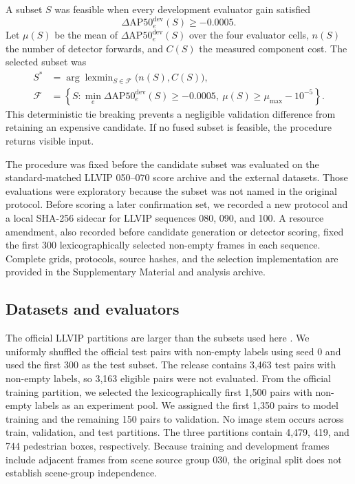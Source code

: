 \documentclass[preprint,11pt]{elsarticle}
\begin{document}
A subset \(S\) was feasible when every development evaluator gain satisfied
\begin{equation}
\Delta \mathrm{AP50}^{\mathrm{dev}}_e(S) \ge -0.0005.
\end{equation}
Let \(\mu(S)\) be the mean of
\(\Delta \mathrm{AP50}^{\mathrm{dev}}_e(S)\) over the four evaluator cells,
\(n(S)\) the number of detector forwards, and \(C(S)\) the measured component
cost. The selected subset was
\begin{equation}
\begin{aligned}
S^\ast&=\arg\operatorname{lexmin}_{S\in\mathcal{F}}
\bigl(n(S),C(S)\bigr),\\
\mathcal{F}&=\left\{S:
\min_e\Delta \mathrm{AP50}^{\mathrm{dev}}_e(S)\ge-0.0005,
\ \mu(S)\ge\mu_{\max}-10^{-5}
\right\}.
\end{aligned}
\end{equation}
This deterministic tie breaking prevents a negligible validation difference
from retaining an expensive candidate. If no fused subset is feasible, the
procedure returns visible input.

The procedure was fixed before the candidate subset was evaluated on the
standard-matched LLVIP 050--070 score archive and the external datasets. Those
evaluations were exploratory because the subset was not named in the original
protocol. Before scoring a later confirmation set, we recorded a new protocol
and a local SHA-256 sidecar for LLVIP sequences 080, 090, and 100. A resource
amendment, also recorded before candidate generation or detector scoring,
fixed the first 300 lexicographically selected non-empty frames in each
sequence. Complete grids, protocols, source hashes, and the selection
implementation are provided in the Supplementary Material and analysis
archive.

\subsection{Datasets and evaluators}

The official LLVIP partitions are larger than the subsets used here
\cite{jia2021}. We uniformly shuffled the official test pairs with non-empty
labels using seed 0 and used the first 300 as the test subset. The release
contains 3,463 test pairs with non-empty labels, so 3,163 eligible pairs were
not evaluated. From the official training partition, we selected the
lexicographically first 1,500 pairs with non-empty labels as an experiment
pool. We assigned the first 1,350 pairs to model training and the remaining 150
pairs to validation. No image stem occurs across train, validation, and test
partitions. The three partitions contain 4,479, 419, and 744 pedestrian boxes,
respectively. Because training and development frames include adjacent frames
from scene source group 030, the original split does not establish
scene-group independence.
\end{document}
